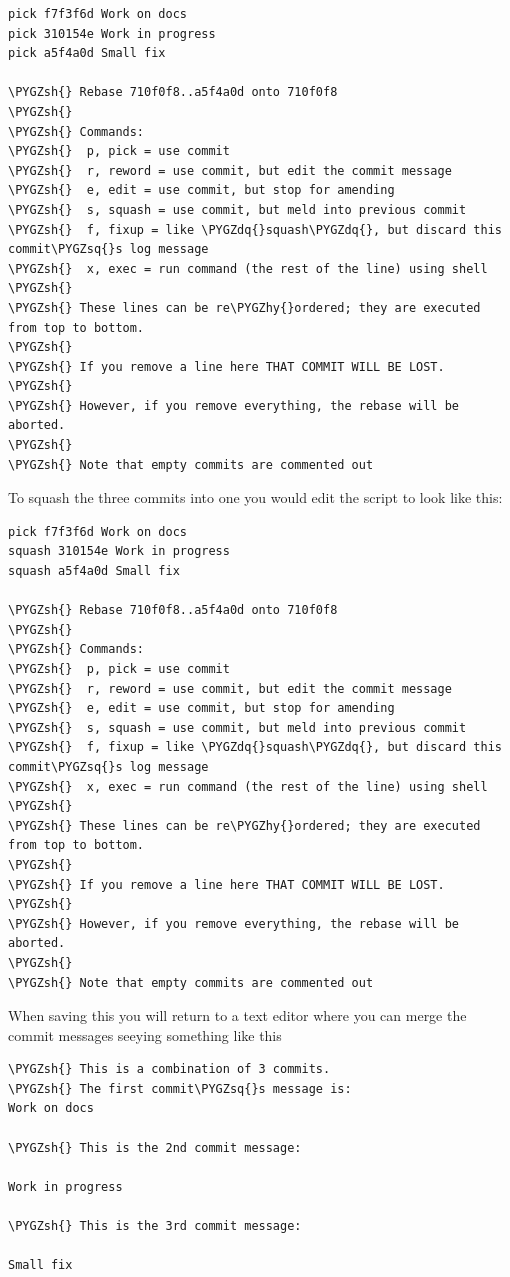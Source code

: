 \documentclass[letterpaper,10pt,english]{sphinxmanual}
\def\PYGZsh{\char`\#}
\def\PYGZhy{\char`\-}
\def\PYGZsq{\char`\'}
\def\PYGZdq{\char`\"}
\renewcommand\PYGZsq{\textquotesingle}
\begin{document}
\begin{Verbatim}[commandchars=\\\{\}]
pick f7f3f6d Work on docs
pick 310154e Work in progress
pick a5f4a0d Small fix

\PYGZsh{} Rebase 710f0f8..a5f4a0d onto 710f0f8
\PYGZsh{}
\PYGZsh{} Commands:
\PYGZsh{}  p, pick = use commit
\PYGZsh{}  r, reword = use commit, but edit the commit message
\PYGZsh{}  e, edit = use commit, but stop for amending
\PYGZsh{}  s, squash = use commit, but meld into previous commit
\PYGZsh{}  f, fixup = like \PYGZdq{}squash\PYGZdq{}, but discard this commit\PYGZsq{}s log message
\PYGZsh{}  x, exec = run command (the rest of the line) using shell
\PYGZsh{}
\PYGZsh{} These lines can be re\PYGZhy{}ordered; they are executed from top to bottom.
\PYGZsh{}
\PYGZsh{} If you remove a line here THAT COMMIT WILL BE LOST.
\PYGZsh{}
\PYGZsh{} However, if you remove everything, the rebase will be aborted.
\PYGZsh{}
\PYGZsh{} Note that empty commits are commented out
\end{Verbatim}

To squash the three commits into one you would edit the script to look
like this:

\begin{Verbatim}[commandchars=\\\{\}]
pick f7f3f6d Work on docs
squash 310154e Work in progress
squash a5f4a0d Small fix

\PYGZsh{} Rebase 710f0f8..a5f4a0d onto 710f0f8
\PYGZsh{}
\PYGZsh{} Commands:
\PYGZsh{}  p, pick = use commit
\PYGZsh{}  r, reword = use commit, but edit the commit message
\PYGZsh{}  e, edit = use commit, but stop for amending
\PYGZsh{}  s, squash = use commit, but meld into previous commit
\PYGZsh{}  f, fixup = like \PYGZdq{}squash\PYGZdq{}, but discard this commit\PYGZsq{}s log message
\PYGZsh{}  x, exec = run command (the rest of the line) using shell
\PYGZsh{}
\PYGZsh{} These lines can be re\PYGZhy{}ordered; they are executed from top to bottom.
\PYGZsh{}
\PYGZsh{} If you remove a line here THAT COMMIT WILL BE LOST.
\PYGZsh{}
\PYGZsh{} However, if you remove everything, the rebase will be aborted.
\PYGZsh{}
\PYGZsh{} Note that empty commits are commented out
\end{Verbatim}

When saving this you will return to a text editor where you can merge
the commit messages seeying something like this

\begin{Verbatim}[commandchars=\\\{\}]
\PYGZsh{} This is a combination of 3 commits.
\PYGZsh{} The first commit\PYGZsq{}s message is:
Work on docs

\PYGZsh{} This is the 2nd commit message:

Work in progress

\PYGZsh{} This is the 3rd commit message:

Small fix
\end{Verbatim}
\end{document}
